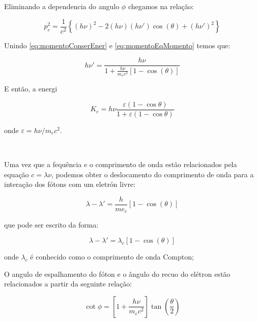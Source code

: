 \documentclass[11pt,a4paper]{article}
\begin{document}
            \noindent Eliminando a dependencia do angulo $\phi$ chegamos na relação:

            \begin{equation}
                p_e^2 = \frac{1}{c^2} \left\{ (h\nu)^2 - 2 (h\nu)(h\nu')\cos(\theta)+  (h\nu')^2\right\}
                \label{eq:momentoEqMomento}
            \end{equation}

            \noindent Unindo \ref{eq:momentoConserEner} e \ref{eq:momentoEqMomento} temos que:

                \begin{equation}
                    h\nu' = \frac{h\nu}{1 + \frac{h\nu}{m_ec^2}[1 - \cos(\theta)]}
                \end{equation}

            \noindent E então, a energi
            
                \begin{equation}
                    K_e = h\nu \frac{\varepsilon (1 - \cos \theta)}{1 + \varepsilon (1 - \cos \theta)}
                \end{equation}

            \noindent onde $\varepsilon = h\nu/m_e c^2$.

            \

            \noindent Uma vez que a fequência e o comprimento de onda estão relacionados pela equação $c = \lambda \nu$, podemos obter o deslocamento do comprimento de onda para a interação dos fótons com um eletrón livre:

                \begin{equation}
                    \lambda - \lambda' = \frac{h}{me_c}[1 - \cos(\theta)]
                \end{equation}

            \noindent que pode ser escrito da forma:

                \begin{equation}
                    \lambda - \lambda' = \lambda_c[1 - \cos(\theta)]
                \end{equation}

            \noindent onde $\lambda_c$ é conhecido como o comprimento de onda Compton;


            \noindent O angulo de espalhamento do fóton e o ângulo do recuo do elétron estão relacionados a partir da seguinte relação:

                \begin{equation}
                    \cot \phi = \left[1 + \frac{h\nu}{m_ec^2} \right]\tan \left(\frac{\theta}{2}\right)
                \end{equation}
\end{document}
